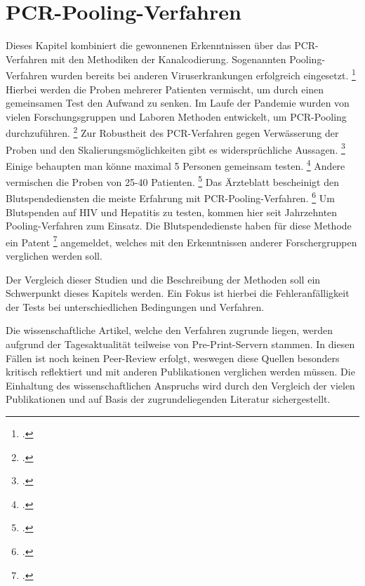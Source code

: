 \section{PCR-Pooling-Verfahren}
Dieses Kapitel kombiniert die gewonnenen Erkenntnissen über das PCR-Verfahren mit den Methodiken der Kanalcodierung.
Sogenannten Pooling-Verfahren wurden bereits bei anderen Viruserkrankungen erfolgreich eingesetzt.
\footcite{Aertzeblatt}
Hierbei werden die Proben mehrerer Patienten vermischt, um durch einen gemeinsamen Test den Aufwand zu senken.
Im Laufe der Pandemie wurden von vielen Forschungsgruppen und Laboren Methoden entwickelt, um PCR-Pooling durchzuführen.
\footcite{calabrese_how_2021}
Zur Robustheit des PCR-Verfahren gegen Verwässerung der Proben und den Skalierungsmöglichkeiten gibt es widersprüchliche Aussagen.
\footcite{Alternative Quelle Pooling}
Einige behaupten man könne maximal 5 Personen gemeinsam testen.
\footcite{schmidt_novel_2020}
Andere vermischen die Proben von 25-40 Patienten.
\footcite{verwilt_evaluation_2021}
Das Ärzteblatt bescheinigt den Blutspendediensten die meiste Erfahrung mit PCR-Pooling-Verfahren.
\footcite{Aertzeblatt}
Um Blutspenden auf HIV und Hepatitis zu testen, kommen hier seit Jahrzehnten Pooling-Verfahren zum Einsatz.
Die Blutspendedienste haben für diese Methode ein Patent
\footcite{roth_verfahren_2007}
angemeldet, welches mit den Erkenntnissen anderer Forschergruppen verglichen werden soll.

Der Vergleich dieser Studien und die Beschreibung der Methoden soll ein Schwerpunkt dieses Kapitels werden.
Ein Fokus ist hierbei die Fehleranfälligkeit der Tests bei unterschiedlichen Bedingungen und Verfahren.

Die wissenschaftliche Artikel, welche den Verfahren zugrunde liegen, werden aufgrund der Tagesaktualität teilweise von Pre-Print-Servern stammen.
In diesen Fällen ist noch keinen Peer-Review erfolgt, weswegen diese Quellen besonders kritisch reflektiert und mit anderen Publikationen verglichen werden müssen.
Die Einhaltung des wissenschaftlichen Anspruchs wird durch den Vergleich der vielen Publikationen und auf Basis der zugrundeliegenden Literatur sichergestellt.